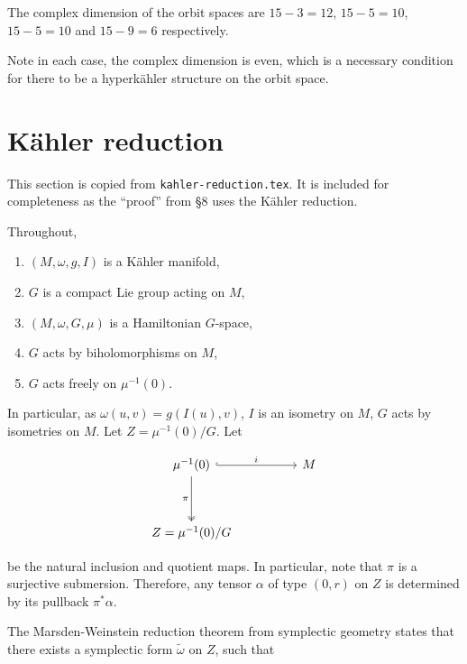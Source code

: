 \documentclass{article}
\renewcommand{\tilde}{\widetilde}
\begin{document}
The complex dimension of the orbit spaces are \(15 - 3 = 12\), \(15 - 5 = 10\), \(15 - 5 = 10\) and \(15 - 9 = 6\) respectively.

Note in each case, the complex dimension is even, which is a necessary condition for there to be a hyperk\"ahler structure on the orbit space.

\section{K\"ahler reduction}

This section is copied from \texttt{kahler-reduction.tex}. It is included for completeness as the ``proof'' from \S 8 uses the K\"ahler reduction.

Throughout,

\begin{enumerate}
    \item \((M, \omega, g, I)\) is a K\"ahler manifold,
    \item \(G\) is a compact Lie group acting on \(M\),
    \item \((M, \omega, G, \mu)\) is a Hamiltonian \(G\)-space,
    \item \(G\) acts by biholomorphisms on \(M\),
    \item \(G\) acts freely on \(\mu^{-1}(0)\).
\end{enumerate}

In particular, as \(\omega(u, v) = g(I(u), v)\), \(I\) is an isometry on \(M\), \(G\) acts by isometries on \(M\). Let \(Z = \mu^{-1}(0)/G\). Let

\[\begin{tikzcd}
	{\mu^{-1}(0)} && M \\
	\\
	{Z=\mu^{-1}(0)/G}
	\arrow["i", hook, from=1-1, to=1-3]
	\arrow["\pi"', two heads, from=1-1, to=3-1]
\end{tikzcd}\]

be the natural inclusion and quotient maps. In particular, note that \(\pi\) is a surjective submersion. Therefore, any tensor \(\alpha\) of type \((0, r)\) on \(Z\) is determined by its pullback \(\pi^*\alpha\).

The Marsden-Weinstein reduction theorem from symplectic geometry states that there exists a symplectic form \(\tilde\omega\) on \(Z\), such that
\end{document}
